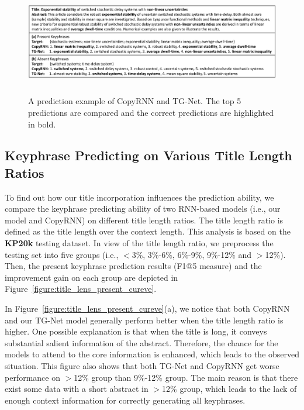 \documentclass[letterpaper]{article} %
\begin{document}
\begin{figure}
\centering
\includegraphics[width=6.210000000000001in,height=1.82in ]{figures/PaperID3210_TGNet_final_case_study_cmyk.pdf}
\caption{A prediction example of CopyRNN and TG-Net. The top 5 predictions are compared and the correct predictions are highlighted in bold.}
\label{figure:case_study}
\end{figure}

\subsection{Keyphrase Predicting on Various Title Length Ratios}
To find out how our title incorporation influences the prediction ability, we compare the keyphrase predicting ability of two RNN-based models (i.e., our model and CopyRNN) on different title length ratios. The title length ratio is defined as the title length over the context length. This analysis is based on the \textbf{KP20k} testing dataset. In view of the title length ratio, we preprocess the testing set into five groups (i.e., $<$3\%, 3\%-6\%, 6\%-9\%, 9\%-12\% and $>$12\%). Then, the present keyphrase prediction results (F1@5 measure) and the improvement gain on each group are depicted in Figure~\ref{figure:title_lens_present_cureve}.


In Figure~\ref{figure:title_lens_present_cureve}(a), we notice that both CopyRNN and our TG-Net model generally perform better when the title length ratio is higher. One possible explanation is that when the title is long, it conveys substantial salient information of the abstract. Therefore, the chance for the models to attend to the core information is enhanced, which leads to the observed situation. This figure also shows that both TG-Net and CopyRNN get worse performance on $>$12\% group than 9\%-12\% group. The main reason is that there exist some data with a short abstract in $>$12\% group, which leads to the lack of enough context information for correctly generating all keyphrases.
\end{document}
